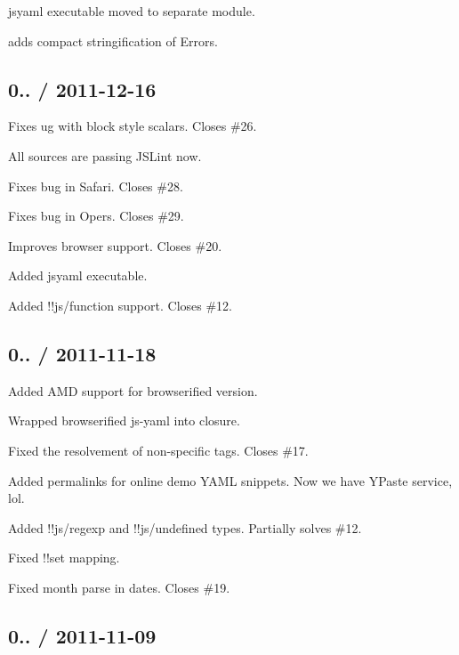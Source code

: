 \begin{DoxyItemize}
\item jsyaml executable moved to separate module.
\item adds {\ttfamily compact} stringification of Errors.
\end{DoxyItemize}

\subsection*{0.. / 2011-\/12-\/16 }


\begin{DoxyItemize}
\item Fixes ug with block style scalars. Closes \#26.
\item All sources are passing J\+S\+Lint now.
\item Fixes bug in Safari. Closes \#28.
\item Fixes bug in Opers. Closes \#29.
\item Improves browser support. Closes \#20.
\item Added jsyaml executable.
\item Added !!js/function support. Closes \#12.
\end{DoxyItemize}

\subsection*{0.. / 2011-\/11-\/18 }


\begin{DoxyItemize}
\item Added A\+MD support for browserified version.
\item Wrapped browserified js-\/yaml into closure.
\item Fixed the resolvement of non-\/specific tags. Closes \#17.
\item Added permalinks for online demo Y\+A\+ML snippets. Now we have Y\+Paste service, lol.
\item Added !!js/regexp and !!js/undefined types. Partially solves \#12.
\item Fixed !!set mapping.
\item Fixed month parse in dates. Closes \#19.
\end{DoxyItemize}

\subsection*{0.. / 2011-\/11-\/09 }


